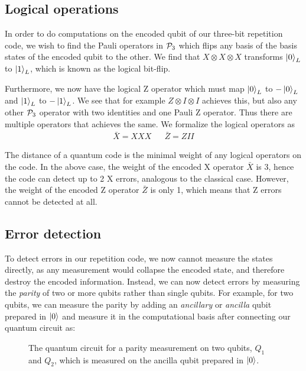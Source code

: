 \subsection{Logical operations}

In order to do computations on the encoded qubit of our three-bit repetition code, we wish to find the Pauli operators in $\mathcal{P}_3$ which flips any basis of the basis states of the encoded qubit to the other. We find that $X\otimes X\otimes X$ transforms $\ket{0}_L$ to $\ket{1}_L$, which is known as the logical bit-flip.

Furthermore, we now have the logical Z operator which must map $\ket{0}_L$ to $-\ket{0}_L$ and $\ket{1}_L$ to $-\ket{1}_L$. We see that for example $Z\otimes I\otimes I$ achieves this, but also any other $\mathcal{P}_3$ operator with two identities and one Pauli Z operator. Thus there are multiple operators that achieves the same. We formalize the logical operators as
\begin{align}\label{eq:qec_3bitlogical}
  \bar{X} = XXX && \bar{Z} = ZII
\end{align}

The distance of a quantum code is the minimal weight of any logical operators on the code. In the above case, the weight of the encoded X operator $\bar{X}$ is 3, hence the code can detect up to 2 X errors, analogous to the classical case. However, the weight of the encoded Z operator $\bar{Z}$ is only 1, which means that Z errors cannot be detected at all.

\subsection{Error detection}

To detect errors in our repetition code, we now cannot measure the states directly, as any measurement would collapse the encoded state, and therefore destroy the encoded information. Instead, we can now detect errors by measuring the \emph{parity} of two or more qubits rather than single qubits. For example, for two qubits, we can measure the parity by adding an \emph{ancillary} or \emph{ancilla} qubit prepared in $\ket{0}$ and measure it in the computational basis after connecting our quantum circuit as:

\begin{figure}
  \centering
  \caption{The quantum circuit for a parity measurement on two qubits, $Q_1$ and $Q_2$, which is measured on the ancilla qubit prepared in $\ket{0}$. }\label{fig:2qubitparity}
\end{figure}


